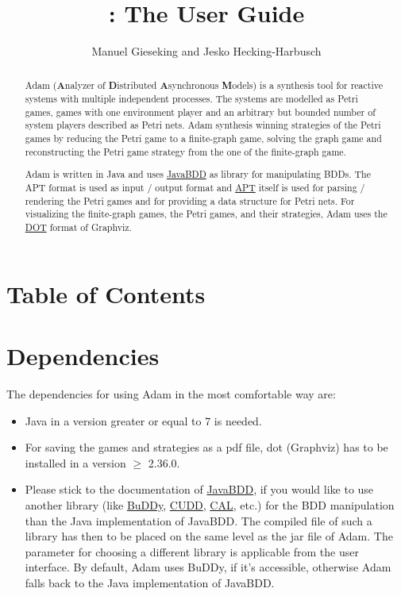 \documentclass[runningheads]{./llncs/llncs}
\title{\tool: The User Guide}
\author{Manuel Gieseking\inst{1}  and Jesko Hecking-Harbusch\inst{2}}
\institute{
Carl von Ossietzky University of Oldenburg, Oldenburg, Germany\\
\email{manuel.gieseking@informatik.uni-oldenburg.de}
\and
Saarland University, Saarbr\"ucken, Germany\\
\email{hecking-harbusch@react.uni-saarland.de}
\\
\vspace{5mm}
\today}
\makeatletter
\newcommand{\tool}{{\sc Adam}}
\def\tableofcontentsmine{
 \def\authcount##1{\setcounter{auco}{##1}\setcounter{@auth}{1}}
 \def\lastand{\ifnum\value{auco}=2\relax
                 \unskip{} \andname\
              \else
                 \unskip \lastandname\
              \fi}%
 \def\and{\stepcounter{@auth}\relax
          \ifnum\value{@auth}=\value{auco}%
             \lastand
          \else
             \unskip,
          \fi}%
 \@starttoc{toc}\if@restonecol\twocolumn\fi}
\makeatother
\begin{document}
\maketitle
\begin{abstract}
\tool{} ({\bf{}A}nalyzer of {\bf{}D}istributed {\bf{}A}synchronous {\bf{}M}odels) is a synthesis tool for reactive
systems with multiple independent processes. The systems are modelled as Petri games,
games with one environment player and an arbitrary but bounded number of system players 
described as Petri nets. \tool{} synthesis winning strategies of the Petri games by reducing
the Petri game to a finite-graph game, solving  the graph game and reconstructing the
Petri game strategy from the one of the finite-graph game.

\tool{} is written in Java and uses \href{http://javabdd.sourceforge.net/index.html}{JavaBDD}
 as library for manipulating BDDs. The APT format
is used as input / output format and \href{https://github.com/CvO-Theory/apt}{APT}
 itself is used for parsing / rendering the Petri
games and for providing a data structure for Petri nets. For visualizing the finite-graph
games, the Petri games, and their strategies, \tool{} uses the \href{http://www.graphviz.org/}{DOT} format of Graphviz. 
\end{abstract}

\section*{Table of Contents}
\tableofcontentsmine

\section{Dependencies}
The dependencies for using \tool{} in the most comfortable way are: 

\begin{itemize}
	\item Java in a version greater or equal to 7 is needed.
 	\item For saving the games and strategies as a pdf file, dot (Graphviz) has to be installed
   in a version $\geq$ 2.36.0.
 	\item Please stick to the documentation of \href{http://javabdd.sourceforge.net/index.html}{JavaBDD},
   if you would like to use another library (like \href{http://www.itu.dk/research/buddy/}{BuDDy}, \href{http://vlsi.colorado.edu/~fabio/CUDD/cuddIntro.html}{CUDD}, \href{http://embedded.eecs.berkeley.edu/Research/cal_bdd/}{CAL}, etc.) for the BDD
   manipulation than the Java implementation of JavaBDD. The compiled file of such a
   library has then to be placed on the same level as the jar file of \tool{}. The parameter
   for choosing a different library is applicable from the user interface. By default,
   \tool{} uses BuDDy, if it's accessible, otherwise \tool{} falls back to the Java
   implementation of JavaBDD.
\end{itemize}
\end{document}
